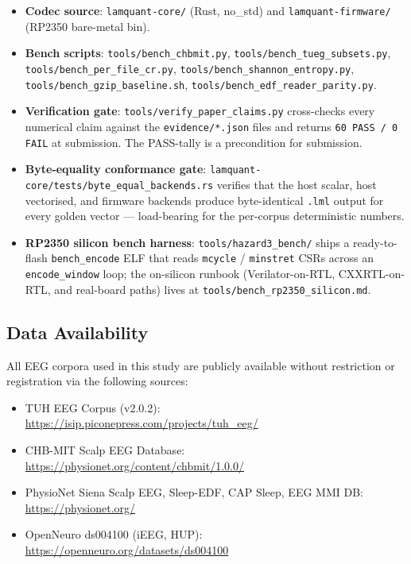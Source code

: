 \documentclass[journal]{IEEEtran}
\begin{document}
\begin{itemize}
\item \textbf{Codec source}: \texttt{lamquant-core/} (Rust, no\_std)
  and \texttt{lamquant-firmware/} (RP2350 bare-metal bin).
\item \textbf{Bench scripts}: \texttt{tools/bench\_chbmit.py},
  \texttt{tools/bench\_tueg\_subsets.py},
  \texttt{tools/bench\_per\_file\_cr.py},
  \texttt{tools/bench\_shannon\_entropy.py},
  \texttt{tools/bench\_gzip\_baseline.sh},
  \texttt{tools/bench\_edf\_reader\_parity.py}.
\item \textbf{Verification gate}: \texttt{tools/verify\_paper\_claims.py}
  cross-checks every numerical claim against the
  \texttt{evidence/*.json} files and returns \texttt{60 PASS / 0
  FAIL} at submission. The PASS-tally is a precondition for
  submission.
\item \textbf{Byte-equality conformance gate}:
  \texttt{lamquant-core/tests/byte\_equal\_backends.rs} verifies
  that the host scalar, host vectorised, and firmware backends
  produce byte-identical \texttt{.lml} output for every golden
  vector — load-bearing for the per-corpus deterministic numbers.
\item \textbf{RP2350 silicon bench harness}:
  \texttt{tools/hazard3\_bench/} ships a ready-to-flash
  \texttt{bench\_encode} ELF that reads \texttt{mcycle} /
  \texttt{minstret} CSRs across an \texttt{encode\_window} loop;
  the on-silicon runbook (Verilator-on-RTL, CXXRTL-on-RTL, and
  real-board paths) lives at \texttt{tools/bench\_rp2350\_silicon.md}.
\end{itemize}

\subsection*{Data Availability}
All EEG corpora used in this study are publicly available without
restriction or registration via the following sources:

\begin{itemize}
\item TUH EEG Corpus (v2.0.2): \\
  \url{https://isip.piconepress.com/projects/tuh_eeg/}
\item CHB-MIT Scalp EEG Database: \\
  \url{https://physionet.org/content/chbmit/1.0.0/}
\item PhysioNet Siena Scalp EEG, Sleep-EDF, CAP Sleep, EEG MMI DB:\\
  \url{https://physionet.org/}
\item OpenNeuro ds004100 (iEEG, HUP):\\
  \url{https://openneuro.org/datasets/ds004100}
\end{itemize}
\end{document}
